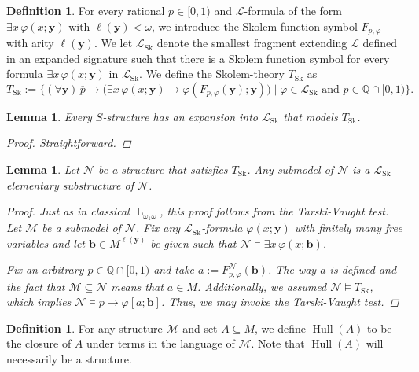 \documentclass{amsart}
\newtheorem{lemma}[theorem]{Lemma}
\theoremstyle{definition}
\newtheorem{definition}[theorem]{Definition}
\numberwithin{equation}{theorem}
\renewcommand{\phi}{\varphi}
\newcommand{\Q}{\mathbb{Q}}
\newcommand{\V}{\mathbf}
\newcommand{\where}{\mid}
\newcommand{\rat}[1]{{\overline{#1}}}
\newcommand{\narrow}[1]{\xrightarrow{#1}}
\renewcommand{\to}{\narrow{}}
\newcommand{\len}{\ell}
\newcommand{\baselang}{\operatorname{L}}
\newcommand{\lang}{\baselang_{\omega_1\omega}}
\newcommand{\Tskolem}{{T_{\operatorname{Sk}}}}
\newcommand{\frag}{\mathcal{L}}
\newcommand{\fragsk}{\frag_{\operatorname{Sk}}}
\newcommand{\skolem}[2]{F_{{#1},{#2}}}
\newcommand{\hull}{\operatorname{Hull}}
\begin{document}
\begin{definition}\label{def:skolem}
  For every rational $p\in[0,1)$ and $\frag$-formula of the form $\exists x\,\phi(x;\V y)$ with $\len(\V y)<\omega$, we introduce the Skolem function symbol $\skolem p{\phi}$ with arity $\len(\V y)$.
  We let $\fragsk$ denote the smallest fragment extending $\frag$ defined in an expanded signature such that there is a Skolem function symbol for every formula $\exists x\,\phi(x;\V y)$ in $\fragsk$.
  We define the Skolem-theory $\Tskolem$ as
  \[
    \Tskolem:=\Big\{(\forall\V y)\,\rat p\to\Big(\exists x\,\phi(x;\V y)\to\phi(\skolem p{\phi}(\V y);\V y)\Big)\where \phi\in\fragsk\text{ and }p\in\Q\cap[0,1)\Big\}.
  \]
\end{definition}

\begin{lemma}
  Every $S$-structure has an expansion into $\fragsk$ that models $\Tskolem$.
  \begin{proof}
    Straightforward.
  \end{proof}
\end{lemma}

\begin{lemma}
  Let $\mathcal N$ be a structure that satisfies $\Tskolem$.
  Any submodel of $\mathcal N$ is a $\fragsk$-elementary substructure of $\mathcal N$.
  \begin{proof}
    Just as in classical $\lang$, this proof follows from the Tarski-Vaught test.
    Let $\mathcal M$ be a submodel of $\mathcal N$.
    Fix any $\fragsk$-formula $\phi(x;\V y)$ with finitely many free variables and let $\V b\in M^{\len(\V y)}$ be given such that $\mathcal N\models\exists x\,\phi(x;\V b)$.
    
    Fix an arbitrary $p\in\Q\cap[0,1)$ and take $a:=\skolem p{\phi}^\mathcal N(\V b)$.
    The way $a$ is defined and the fact that $\mathcal M\subseteq\mathcal N$ means that $a\in M$.
    Additionally, we assumed $\mathcal N\models \Tskolem$, which implies $\mathcal N\models \rat p\to\phi[a;\V b]$.
    Thus, we may invoke the Tarski-Vaught test.
  \end{proof}
\end{lemma}

\begin{definition}
  For any structure $\mathcal M$ and set $A\subseteq M$, we define $\hull(A)$ to be the closure of $A$ under terms in the language of $\mathcal M$.
  Note that $\hull(A)$ will necessarily be a structure.
\end{definition}
\end{document}
